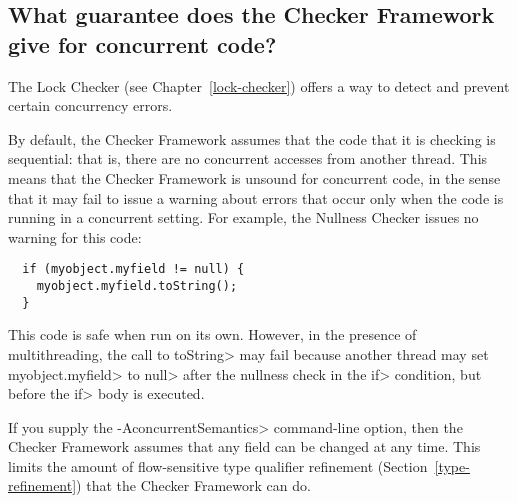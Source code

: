 \subsection{What guarantee does the Checker Framework give for concurrent code?\label{faq-concurrency}}

The Lock Checker (see Chapter~\ref{lock-checker}) offers a way to detect
and prevent certain concurrency errors.


By default, the Checker Framework assumes that the code that it is checking
is sequential:  that is, there are no concurrent accesses from another
thread.  This means that the Checker Framework is unsound for concurrent
code, in the sense that it may fail to issue a warning about errors that
occur only when the code is running in a concurrent setting.
For example, the Nullness Checker issues no warning for this
code:

\begin{Verbatim}
  if (myobject.myfield != null) {
    myobject.myfield.toString();
  }
\end{Verbatim}

\noindent
This code is safe when run on its own.
However, in the presence of multithreading, the call to \<toString> may
fail because another thread may set \<myobject.myfield> to \<null> after
the nullness check in the \<if> condition, but before the \<if> body is
executed.

If you supply the \<-AconcurrentSemantics> command-line option, then the
Checker Framework assumes that any field can be changed at any time.  This
limits the amount of flow-sensitive type qualifier refinement
(Section~\ref{type-refinement}) that the Checker Framework can do.


%
%
%
%
%
%
%


